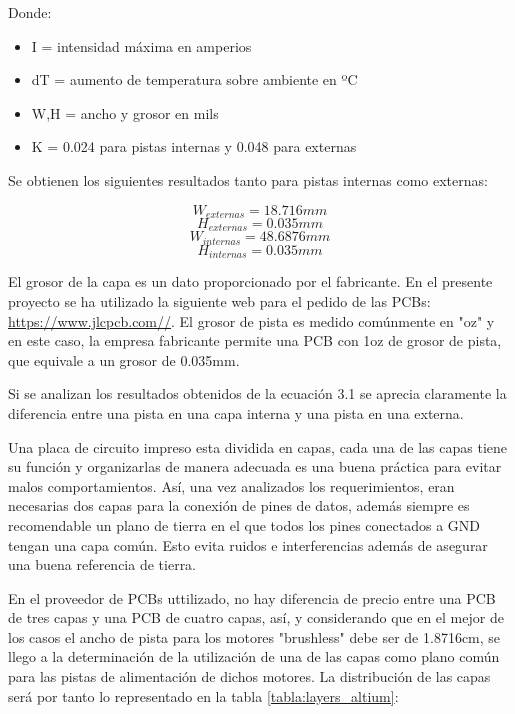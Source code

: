 Donde: 
\begin{itemize}
	\item I = intensidad máxima en amperios
	\item dT = aumento de temperatura sobre ambiente en ºC
	\item W,H = ancho y grosor en mils
	\item K = 0.024 para pistas internas y 0.048 para externas
\end{itemize}

Se obtienen los siguientes resultados tanto para pistas internas como externas: 

\begin{equation*}
		W_{externas} = 18.716 mm 
\end{equation*} 
\begin{equation*}
		H_{externas} = 	0.035 mm
\end{equation*}
\begin{equation*}
W_{internas} =  48.6876 mm 
\end{equation*} 
\begin{equation*}
H_{internas} = 	0.035 mm
\end{equation*}

El grosor de la capa es un dato proporcionado por el fabricante. En el presente proyecto se ha utilizado la siguiente web para el pedido de las PCBs: \url{https://www.jlcpcb.com//}. \newline 
El grosor de pista es medido comúnmente en "oz" y en este caso, la empresa fabricante permite una PCB con 1oz de grosor de pista, que equivale a un grosor de 0.035mm.\newline

Si se analizan los resultados obtenidos de la ecuación 3.1 se aprecia claramente la diferencia entre una pista en una capa interna y una pista en una externa. \newline

Una placa de circuito impreso esta dividida en capas, cada una de las capas tiene su función y organizarlas de manera adecuada es una buena práctica para evitar malos comportamientos. Así, una vez analizados los requerimientos, eran necesarias dos capas para la conexión de pines de datos, además siempre es recomendable un plano de tierra en el que todos los pines conectados a GND tengan una capa común. Esto evita ruidos e interferencias además de asegurar una buena referencia de tierra. \newline

En el proveedor de PCBs uttilizado, no hay diferencia de precio entre una PCB de tres capas y una PCB de cuatro capas, así, y considerando que en el mejor de los casos el ancho de pista para los motores "brushless" debe ser de 1.8716cm, se llego a la determinación de la utilización de una de las capas como plano común para las pistas de alimentación de dichos motores. La distribución de las capas será por tanto lo representado en la tabla \ref{tabla:layers_altium}: 

